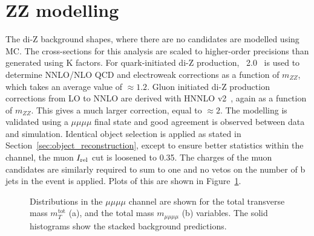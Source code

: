 \section{ZZ modelling}
\label{sec:zz_modelling}

The di-Z background shapes, where there are no \jtth candidates are modelled using \ac{MC}.
The cross-sections for this analysis are scaled to higher-order precisions than generated using K factors.
For quark-initiated di-Z production, \POWHEG~2.0~\cite{Nason:2004rx,Frixione:2007vw,Alioli:2010xd,Jezo:2015aia} is used to determine \ac{NNLO}/\ac{NLO} \ac{QCD} and electroweak corrections as a function of $m_{ZZ}$, which takes an average value of $\approx 1.2$.
Gluon initiated di-Z production corrections from \ac{LO} to \ac{NNLO} are derived with HNNLO v2~\cite{PhysRevLett.98.222002}, again as a function of $m_{ZZ}$.
This gives a much larger correction, equal to $\approx 2$.
The modelling is validated using a $\mu\mu\mu\mu$ final state and good agreement is observed between data and simulation.
Identical object selection is applied as stated in Section~\ref{sec:object_reconstruction}, except to ensure better statistics within the channel, the muon $I_{\text{rel}}$ cut is loosened to 0.35.
The charges of the muon candidates are similarly required to sum to one and no vetos on the number of b jets in the event is applied.
Plots of this are shown in Figure~\ref{fig:4tau_mmmm}. \\

\begin{figure}[!hbtp]
\centering
\caption[Plots of the distributions in the $\mu\mu\mu\mu$ channel.]{Distributions in the $\mu\mu\mu\mu$ channel are shown for the total transverse mass $m_{T}^{\text{tot}}$ (a), and the total mass $m_{\mu\mu\mu\mu}$ (b) variables. The solid histograms show the stacked background predictions.}
\label{fig:4tau_mmmm}
\end{figure}


